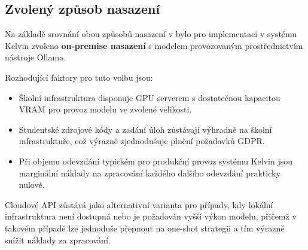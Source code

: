 \subsection{Zvolený způsob nasazení}
\label{subsec:choice-deployment}

Na základě srovnání obou způsobů nasazení v  bylo pro implementaci v systému Kelvin zvoleno \textbf{on-premise nasazení} s modelem provozovaným prostřednictvím nástroje Ollama.

Rozhodující faktory pro tuto volbu jsou:
\begin{itemize}
    \item Školní infrastruktura disponuje GPU serverem s dostatečnou kapacitou VRAM pro provoz modelu ve zvolené velikosti.
    \item Studentské zdrojové kódy a zadání úloh zůstávají výhradně na školní infrastruktuře, což výrazně zjednodušuje plnění požadavků GDPR\@.
    \item Při objemu odevzdání typickém pro produkční provoz systému Kelvin jsou marginální náklady na zpracování každého dalšího odevzdání prakticky nulové.
\end{itemize}

Cloudové API zůstává jako alternativní varianta pro případy, kdy lokální infrastruktura není dostupná nebo je požadován vyšší výkon modelu, přičemž v takovém případě lze jednoduše přepnout na one-shot strategii a tím výrazně snížit náklady za zpracování.

\endinput